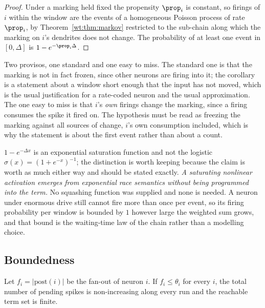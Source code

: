 \begin{proof}
Under a marking held fixed the propensity $\prop_i$ is constant, so firings of $i$ within
the window are the events of a homogeneous Poisson process of rate $\prop_i$, by
Theorem~\ref{wt:thm:markov} restricted to the sub-chain along which the marking on $i$'s
dendrites does not change. The probability of at least one event in $[0,\Delta]$ is
$1 - e^{-\prop_i \Delta}$.
\end{proof}

Two provisos, one standard and one easy to miss. The standard one is that the marking is
not in fact frozen, since other neurons are firing into it; the corollary is a statement
about a window short enough that the input has not moved, which is the usual
justification for a rate-coded neuron and the usual approximation. The one easy to miss
is that $i$'s \emph{own} firings change the marking, since a firing consumes the spike it
fired on. The hypothesis must be read as freezing the marking against all sources of
change, $i$'s own consumption included, which is why the statement is about the first
event rather than about a count.

\begin{remark}
\label{spk:rmk:notlogistic}
$1 - e^{-\Delta x}$ is an exponential saturation function and not the logistic
$\sigma(x) = (1+e^{-x})^{-1}$; the distinction is worth keeping because the claim is
worth as much either way and should be stated exactly. \emph{A saturating nonlinear
activation emerges from exponential race semantics without being programmed into the
term.} No squashing function was supplied and none is needed. A neuron under enormous
drive still cannot fire more than once per event, so its firing probability per window is
bounded by $1$ however large the weighted sum grows, and that bound is the waiting-time
law of the chain rather than a modelling choice.
\end{remark}

\subsection{Boundedness}

\begin{lemma}[Boundedness]
\label{spk:lem:bounded}
Let $f_i = |\mathrm{post}(i)|$ be the fan-out of neuron $i$. If $f_i \leq \theta_i$ for
every $i$, the total number of pending spikes is non-increasing along every run and the
reachable term set is finite.
\end{lemma}

